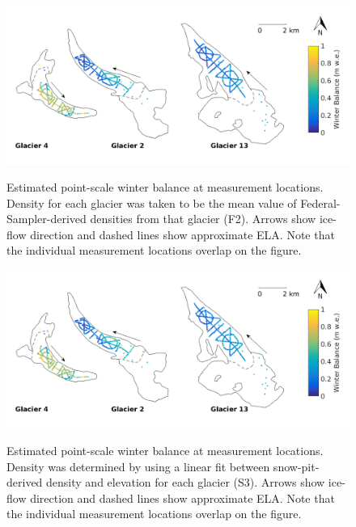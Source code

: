 \documentclass{sfuthesis}
\begin{document}
\begin{figure}[H]
	\centering
	\includegraphics[width = \textwidth]{SWEmap_opt5.png}\\
	\caption{Estimated point-scale winter balance at measurement locations. Density for each glacier was taken to be the mean value of Federal-Sampler-derived densities from that glacier (F2). Arrows show ice-flow direction and dashed lines show approximate ELA. Note that the individual measurement locations overlap on the figure.}
	\label{fig:SWEmap_F2}
\end{figure}

\begin{figure}[H]
	\centering
	\includegraphics[width = \textwidth]{SWEmap_opt6.png}\\
	\caption{Estimated point-scale winter balance at measurement locations. Density was determined by using a linear fit between snow-pit-derived density and elevation for each glacier (S3). Arrows show ice-flow direction and dashed lines show approximate ELA. Note that the individual measurement locations overlap on the figure.}
	\label{fig:SWEmap_S3}
\end{figure}
\end{document}
